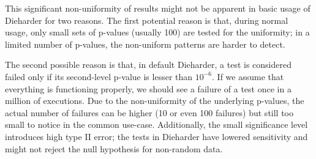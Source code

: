 \documentclass[
  digital,  	%
  color,		%
  oneside,   	%
  12pt,
  nocover,
  notable,
  nolof,
  nolot,
]{fithesis3}
\theoremstyle{definition}
\theoremstyle{remark}
\begin{document}
This significant non-uniformity of results might not be apparent in basic usage of Dieharder for two reasons. The first potential reason is that, during normal usage, only small sets of p-values (usually 100) are tested for the uniformity; in a limited number of p-values, the non-uniform patterns are harder to detect. 

The second possible reason is that, in default Dieharder, a test is considered failed only if its second-level p-value is lesser than $10^{-6}$. If we assume that everything is functioning properly, we should see a failure of a test once in a million of executions. Due to the non-uniformity of the underlying p-values, the actual number of failures can be higher (10 or even 100 failures) but still too small to notice in the common use-case. Additionally, the small significance level introduces high type II error; the tests in Dieharder have lowered sensitivity and might not reject the null hypothesis for non-random data.
\end{document}

